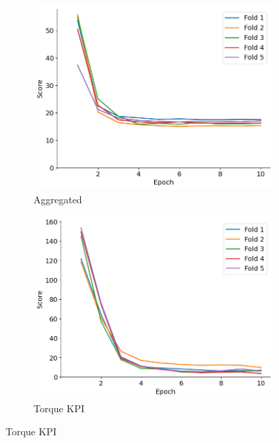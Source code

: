 \documentclass{report} %
\begin{document}
\begin{figure}[H]
    \centering
    \begin{subfigure}{0.32\textwidth}
        \centering
        \includegraphics[width=\textwidth]{./ReportImages/val_score.png}
        \caption{\centering Aggregated}
        \label{fig:Aggregated Validation Score}
    \end{subfigure}\hfill
    \begin{subfigure}{0.32\textwidth}
        \centering
        \includegraphics[width=\textwidth]{./ReportImages/val_score_y1.png}
        \caption{\centering Torque \ac{KPI}}
        \label{fig:Validation Score for Torque Curve}
    \end{subfigure}\hfill

\end{figure}
\end{document}
